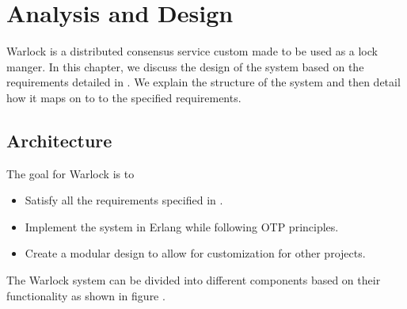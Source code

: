 \chapter{Analysis and Design}
\label{chapter:analysis.design}

Warlock is a distributed consensus service custom made to be used as a
lock manger. In this chapter, we discuss the design of the system based on the 
requirements detailed in . We explain the structure 
of the system and then detail how it maps on to to the specified requirements.

\section{Architecture}

The goal for Warlock is to

\begin{itemize}
  \item Satisfy all the requirements specified in .
  \item Implement the system in Erlang while following OTP principles.
  \item Create a modular design to allow for customization for other projects.
\end{itemize}

The Warlock system can be divided into different components based on their
functionality as shown in figure .

